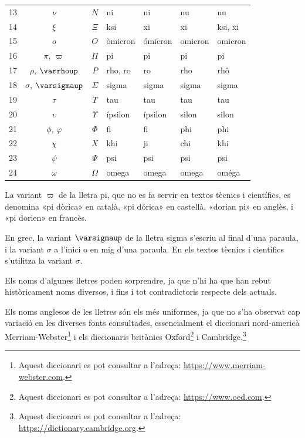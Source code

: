 \begin{center}
\begin{threeparttable}
\begin{tabular}{cccllll}
		13 & $\nu$ & $N$ & ni & ni &  nu & nu\\
		14 & $\xi$ & $\Xi$ & ksi & xi &  xi & ksi, xi\\
		15 & $o$ & $O$ & òmicron & ómicron &  omicron & omicron\\
		16 & $\pi$, $\varpi$\tnote{\color{blue}(a)} & $\Pi$ & pi & pi &  pi & pi\\
		17 & $\rho$, $\varrhoup$ & $P$ & rho, ro & ro &  rho & rhô\\
		18 & $\sigma$, $\varsigmaup$\tnote{\color{blue}(b)} & $\Sigma$ & sigma & sigma &  sigma &sigma\\
		19 & $\tau$ & $T$ & tau & tau & tau &tau\\
		20 & $\upsilon$ & $\Upsilon$ & ípsilon & ípsilon &  silon &silon\\
		21 & $\phi$, $\varphi$ & $\Phi$ & fi & fi &  phi & phi\\
		22 & $\chi$ & $X$ & khi & ji &  chi & khi\\
		23 & $\psi$ & $\Psi$ & psi & psi &  psi & psi\\
		24 & $\omega$ & $\Omega$ & omega & omega &  omega & oméga\\
		\bottomrule[1pt]
	\end{tabular}
	\begin{tablenotes}
		\item[\color{blue}(a)] {\footnotesize La variant $\varpi$ de la lletra pi, que no es fa servir en textos tècnics i científics, es denomina «pi dòrica» en  català, «pi dórica» en castellà, «dorian pi» en anglès, i «pi dorien» en francès.}
		\item[\color{blue}(b)] {\footnotesize En grec, la variant $\varsigmaup$ de la lletra sigma s'escriu  al final d'una paraula, i la variant $\sigma$  a l'inici o en mig d'una paraula. En els textos tècnics i científics s'utilitza  la variant $\sigma$.}
	\end{tablenotes}
\end{threeparttable}
\end{center}



Els noms d'algunes lletres poden sorprendre, ja que n'hi ha que han rebut històricament noms
diversos, i fins i tot contradictoris respecte dels actuals.

Els noms anglesos de les lletres són els més uniformes, ja que no
s'ha observat cap variació en les diverses fonts consultades, essencialment el diccionari nord-americà Merriam-Webster\footnote{Aquest diccionari es pot consultar a l'adreça: \href{https://www.merriam-webster.com/}{https:/\!\!/www.merriam-webster.com}.} i els diccionaris britànics Oxford\footnote{Aquest diccionari es pot consultar a l'adreça: \href{https://www.oed.com/}{https:/\!\!/www.oed.com}.} i Cambridge.\footnote{Aquest diccionari es pot consultar a l'adreça: \href{https://dictionary.cambridge.org/}{https:/\!\!/dictionary.cambridge.org}.}


